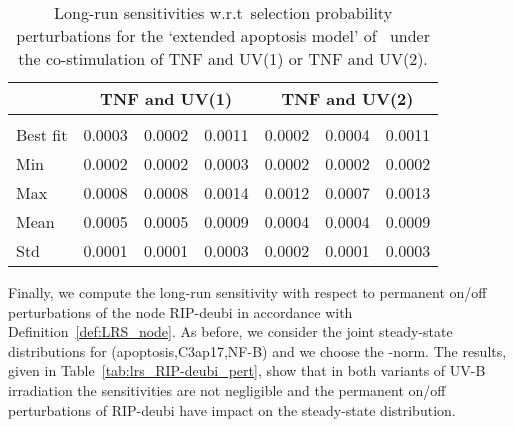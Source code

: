 \documentclass[runningheads,a4paper]{llncs}
\newcommand{\node}[1]{{\fontfamily{lmss}\selectfont #1}}
\begin{document}
\begin{table}[!t]
\centering
\begin{tabular}{|l|c|c|c||c|c|c|}
\cline{2-7}
\multicolumn{1}{c|}{} & \multicolumn{3}{c||}{\node{TNF} and \node{UV(1)}} & \multicolumn{3}{c|}{\node{TNF} and \node{UV(2)}}\\
\hline
\hspace{2mm}  \hspace{2mm} & \hspace{2mm}  \hspace{2mm} &
\hspace{2mm}  \hspace{2mm} & \hspace{4mm}  &
\hspace{2mm}  \hspace{2mm} & \hspace{2mm}  \hspace{2mm} &
\hspace{4mm} \\
\hline\hline
Best fit & 0.0003 & 0.0002 & 0.0011 & 0.0002 & 0.0004 & 0.0011\\
\hline
Min & 0.0002 & 0.0002 & 0.0003 & 0.0002 & 0.0002 & 0.0002\\
\hline
Max & 0.0008 & 0.0008 & 0.0014 & 0.0012 & 0.0007 & 0.0013\\
\hline
Mean & 0.0005 & 0.0005 & 0.0009 & 0.0004 & 0.0004 & 0.0009\\
\hline
Std & 0.0001 & 0.0001 & 0.0003 & 0.0002 & 0.0001 & 0.0003\\
\hline
\end{tabular}
\caption{Long-run sensitivities w.r.t\ selection probability perturbations for the `extended
apoptosis model' of~\cite{TMPTS14} under the co-stimulation of TNF and UV(1) or TNF and UV(2).}
\label{tab:lrs_complex2}
\end{table}



Finally, we compute the long-run sensitivity with respect to permanent on/off perturbations of the
node \node{RIP-deubi} in accordance with Definition~\ref{def:LRS_node}. As before, we consider the
joint steady-state distributions for (\node{apoptosis},\node{C3ap17},\node{NF-B}) and we
choose the -norm. The results, given in Table~\ref{tab:lrs_RIP-deubi_pert}, show that in both
variants of UV-B irradiation the sensitivities are not negligible and the permanent on/off
perturbations of \node{RIP-deubi} have impact on the steady-state distribution.
\end{document}
